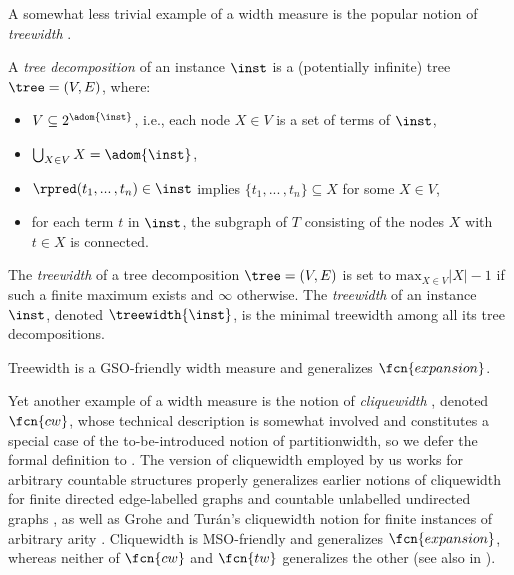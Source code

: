 \medskip {}
A somewhat less trivial example of a width measure is the popular notion of \emph{treewidth} \cite{ROBERTSON198449}.

\begin{definition}[treewidth]
A \emph{tree decomposition} of an instance $\inst$ is a (potentially infinite) tree $\tree = (V,E)$, where:
\begin{itemize}

\item $V \subseteq 2^{\adom{\inst}}$, i.e., each node $X \in V$ is a set of terms of $\inst$, 
\item $\bigcup_{X \in V} X = \adom{\inst}$,

\item $\rpred(t_{1}, ...\,,t_{n}) \in \inst$ implies $\{t_{1}, ...\,,t_{n}\} \subseteq X$ for some $X \in V$,

\item for each term $t$ in $\inst$, the subgraph of $T$ consisting of the nodes $X$ with $t \in X$ is connected.
\end{itemize}

The \emph{treewidth} of a tree decomposition $\tree = (V,E)$ is set to $\mathrm{max}_{X \in V} |X| - 1 $ if such a finite maximum exists and $\infty$ otherwise. The \emph{treewidth} of an instance $\inst$, denoted $\treewidth{\inst}$, is the minimal treewidth among all its tree decompositions. 
\end{definition}

Treewidth is a GSO-friendly width measure \cite[Thm. 9.18]{CourEngBook} and generalizes $\fcn{expansion}$.

\pagebreak

\medskip {}
Yet another example of a width measure is the notion of \emph{cliquewidth} \cite{ICDT2023}, denoted $\fcn{cw}$, whose technical description is somewhat involved and constitutes a special case of the to-be-introduced notion of partitionwidth, so we defer the formal definition to . The version of cliquewidth employed by us works for arbitrary countable structures properly generalizes earlier notions of cliquewidth for finite directed edge-labelled graphs \cite{CourEngBook} and countable un\-label\-led un\-di\-rec\-ted graphs \cite{Cou04}, as well as 
Grohe and Turán's cliquewidth notion for finite instances of arbitrary arity \cite{GroheT04}. %
%
Cliquewidth is MSO-friendly \cite[Thm. 11]{ICDT2023} and generalizes $\fcn{expansion}$, whereas neither of $\fcn{cw}$ and $\fcn{tw}$ generalizes the other (see also  in ). 

